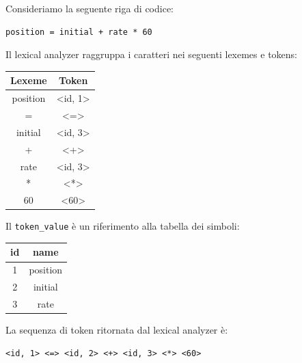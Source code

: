 \documentclass[a4paper]{article}
\begin{document}
\begin{example}
  Consideriamo la seguente riga di codice:
\begin{lstlisting}[numbers=none]
  position = initial + rate * 60
\end{lstlisting}
  Il lexical analyzer raggruppa i caratteri nei seguenti lexemes e tokens:
  \begin{table}[H]
    \centering
    \begin{tabular}{|c|c|}
      \hline
      Lexeme & Token \\
      \hline
      position & <id, 1> \\
      = & <=> \\
      initial & <id, 3> \\
      + & <+> \\
      rate & <id, 3> \\
      * & <*> \\
      60 & <60> \\
      \hline
    \end{tabular}
  \end{table}
  \noindent
  Il \texttt{token\_value} è un riferimento alla tabella dei simboli:
  \begin{table}[H]
    \centering
    \begin{tabular}{|c|c|}
      \hline
      id & name \\
      \hline
      1 & position \\
      2 & initial \\
      3 & rate \\
      \hline
    \end{tabular}
  \end{table}
  \noindent
  La sequenza di token ritornata dal lexical analyzer è:
\begin{lstlisting}[numbers=none]
<id, 1> <=> <id, 2> <+> <id, 3> <*> <60>
\end{lstlisting}
\end{example}
\end{document}
